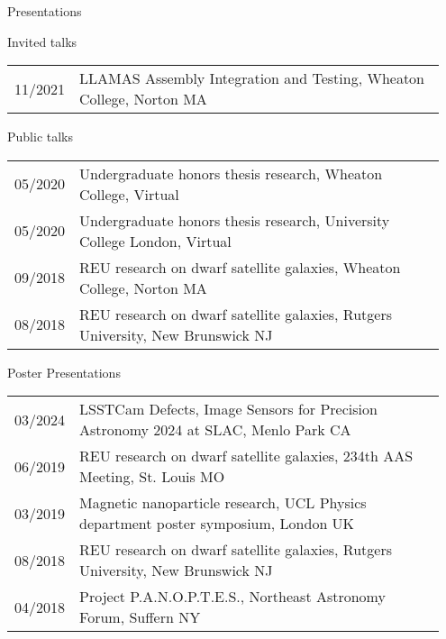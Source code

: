 \documentclass{resume} %
\begin{document}
\begin{rSection}{Presentations}

\begin{rSubsection}{Invited talks}{}{}{}
    \begin{table}[h]
\begin{tabular}{p{0.07\linewidth} p{0.88\linewidth}}
11/2021 & LLAMAS Assembly Integration and Testing, Wheaton College, Norton MA\\
\end{tabular}
\end{table}
\end{rSubsection}

\begin{rSubsection}{Public talks}{}{}{}
    \begin{table}[h]
\begin{tabular}{p{0.07\linewidth} p{0.88\linewidth}}
05/2020 & Undergraduate honors thesis research, Wheaton College, Virtual\\ 
05/2020 & Undergraduate honors thesis research, University College London, Virtual\\
09/2018 & REU research on dwarf satellite galaxies, Wheaton College, Norton MA\\
08/2018 & REU research on dwarf satellite galaxies, Rutgers University, New Brunswick NJ\\
\end{tabular}
\end{table}
\end{rSubsection}

\begin{rSubsection}{Poster Presentations}{}{}{}
\begin{table}[h]
\begin{tabular}{p{0.07\linewidth} p{0.88\linewidth}}
03/2024 & LSSTCam Defects, Image Sensors for Precision Astronomy 2024 at SLAC, Menlo Park CA\\
06/2019 & REU research on dwarf satellite galaxies, 234th AAS Meeting, St. Louis MO\\
03/2019 & Magnetic nanoparticle research, UCL Physics department poster symposium, London UK\\
08/2018 & REU research on dwarf satellite galaxies, Rutgers University, New Brunswick NJ\\
04/2018 & Project P.A.N.O.P.T.E.S., Northeast Astronomy Forum, Suffern NY\\
\end{tabular}
\end{table}
\end{rSubsection}

\end{rSection}
\end{document}
